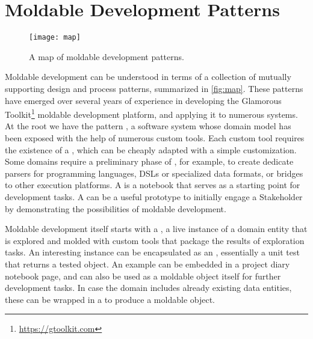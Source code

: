 \documentclass[sigconf]{acmart}
\begin{document}
\section{Moldable Development Patterns}

\begin{figure}[h]
  \texttt{[image: map]}
  \caption{A map of moldable development patterns.}
  \label{fig:map}
\end{figure}


Moldable development can be understood in terms of a collection of mutually supporting design and process patterns, summarized in \autoref{fig:map}.
These patterns have emerged over several years of experience in developing the Glamorous Toolkit\footnote{\url{https://gtoolkit.com}} moldable development platform, and applying it to numerous systems.
At the root we have the pattern , a software system whose domain model has been exposed with the help of numerous custom tools.
Each custom tool requires the existence of a , which can be cheaply adapted with a simple customization.
Some domains require a preliminary phase of , for example, to create dedicate parsers for programming languages, DSLs or specialized data formats, or bridges to other execution platforms.
A  is a notebook that serves as a starting point for development tasks.
A  can be a useful prototype to initially engage a Stakeholder by demonstrating the possibilities of moldable development.

Moldable development itself starts with a , a live instance of a domain entity that is explored and molded with custom tools that package the results of exploration tasks.
An interesting instance can be encapsulated as an , essentially a unit test that returns a tested object.
An example can be embedded in a project diary notebook page, and can also be used as a moldable object itself for further development tasks.
In case the domain includes already existing data entities, these can be wrapped in a  to produce a moldable object.
\end{document}
